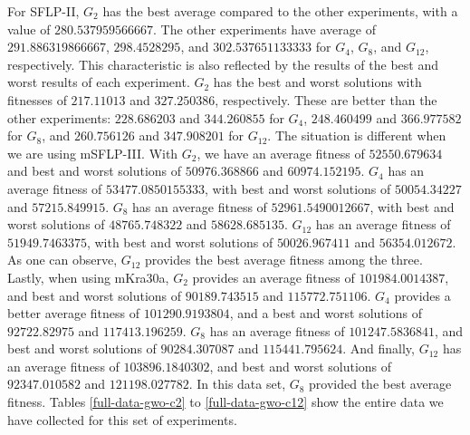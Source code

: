 For SFLP-II, $G_{2}$ has the best average compared to the other experiments, with a value of $280.537959566667$. The other experiments have average of $291.886319866667$, $298.4528295$, and $302.537651133333$ for $G_{4}$, $G_{8}$, and $G_{12}$, respectively. This characteristic is also reflected by the results of the best and worst results of each experiment. $G_{2}$ has the best and worst solutions with fitnesses of $217.11013$ and $327.250386$, respectively. These are better than the other experiments: $228.686203$ and $344.260855$ for $G_{4}$, $248.460499$ and $366.977582$ for $G_{8}$, and $260.756126$ and $347.908201$ for $G_{12}$. The situation is different when we are using mSFLP-III. With $G_{2}$, we have an average fitness of $52550.679634$ and best and worst solutions of $50976.368866$ and $60974.152195$. $G_{4}$ has an average fitness of $53477.0850155333$, with best and worst solutions of $50054.34227$ and $57215.849915$. $G_{8}$ has an average fitness of $52961.5490012667$, with best and worst solutions of $48765.748322$ and $58628.685135$. $G_{12}$ has an average fitness of $51949.7463375$, with best and worst solutions of $50026.967411$ and $56354.012672$. As one can observe, $G_{12}$ provides the best average fitness among the three. Lastly, when using mKra30a, $G_{2}$ provides an average fitness of $101984.0014387$, and best and worst solutions of $90189.743515$ and $115772.751106$. $G_{4}$ provides a better average fitness of $101290.9193804$, and a best and worst solutions of $92722.82975$ and $117413.196259$. $G_{8}$ has an average fitness of $101247.5836841$, and best and worst solutions of $90284.307087$ and $115441.795624$. And finally, $G_{12}$ has an average fitness of $103896.1840302$, and best and worst solutions of $92347.010582$ and $121198.027782$. In this data set, $G_{8}$ provided the best average fitness. Tables \ref{full-data-gwo-c2} to \ref{full-data-gwo-c12} show the entire data we have collected for this set of experiments.

